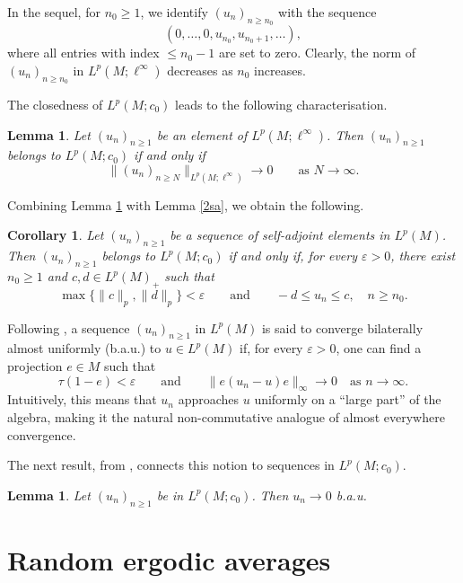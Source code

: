 \documentclass[12pt]{amsart}
\newtheorem{lemma}[theorem]{Lemma}
\newtheorem{corollary}[theorem]{Corollary}
\theoremstyle{remark}
\theoremstyle{definition}
\numberwithin{equation}{section}
\begin{document}
In the sequel, for $n_0 \ge 1$, we identify $(u_n)_{n \ge n_0}$ with the sequence
$$
(0, \ldots, 0, u_{n_0}, u_{n_0+1}, \ldots),
$$
where all entries with index $\le n_0 - 1$ are set to zero.  
Clearly, the norm of $(u_n)_{n \ge n_0}$ in $L^p(M;\ell^\infty)$ decreases as $n_0$ increases.

The closedness of $L^p(M;c_0)$ leads to the following characterisation.

\begin{lemma}\label{2Car-c0}
Let $(u_n)_{n \ge 1}$ be an element of $L^p(M;\ell^\infty)$. Then $(u_n)_{n \ge 1}$ belongs to $L^p(M;c_0)$ if and only if
$$
\bigl\|(u_n)_{n \ge N}\bigr\|_{L^p(M;\ell^\infty)} \longrightarrow 0 \qquad \text{as } N \to \infty.
$$
\end{lemma}

Combining Lemma \ref{2Car-c0} with Lemma \ref{2sa}, we obtain the following.

\begin{corollary}\label{Criteria-sa}
Let $(u_n)_{n \ge 1}$ be a sequence of self-adjoint elements in $L^p(M)$.  
Then $(u_n)_{n \ge 1}$ belongs to $L^p(M;c_0)$ if and only if, for every $\varepsilon > 0$, there exist $n_0 \ge 1$ and $c, d \in L^p(M)_+$ such that
$$
\max\{\|c\|_p, \|d\|_p\} < \varepsilon
\qquad \text{and} \qquad 
-d \le u_n \le c, \quad n \ge n_0.
$$
\end{corollary}

Following \cite[Definition 6.1]{JX}, a sequence $(u_n)_{n \ge 1}$ in $L^p(M)$ is said to converge bilaterally almost uniformly (b.a.u.) to $u \in L^p(M)$ if, for every $\varepsilon > 0$, one can find a projection $e \in M$ such that
$$
\tau(1-e) < \varepsilon \qquad \text{and} \qquad \| e(u_n - u)e \|_\infty \to 0 \quad \text{as } n \to \infty.
$$
Intuitively, this means that $u_n$ approaches $u$ uniformly on a “large part” 
of the algebra, making it the natural non-commutative analogue of almost 
everywhere convergence.  

The next result, from \cite[Lemma 6.2]{JX}, connects this notion to sequences in $L^p(M;c_0)$.

\begin{lemma}\label{2c0-bau}
Let $(u_n)_{n \ge 1}$ be in $L^p(M;c_0)$. Then $u_n \to 0$ b.a.u.
\end{lemma}

\section{Random ergodic averages}\label{3}
\end{document}
